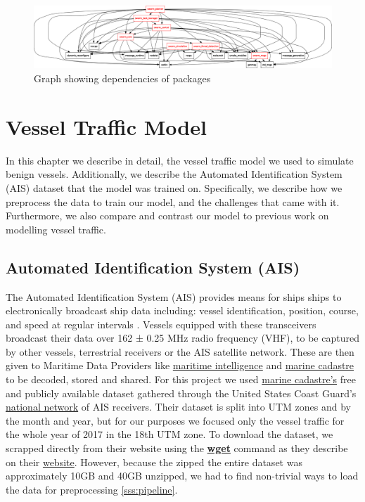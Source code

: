 \documentclass[bsc,frontabs,twoside,singlespacing,parskip,deptreport]{infthesis}     %
\begin{document}
\begin{figure}
    \centering
    \includegraphics[width=\linewidth]{report/images/rospackgraph.png}
    \caption{Graph showing dependencies of packages}
    \label{img:packages}
\end{figure}


\chapter{Vessel Traffic Model}
\label{chap:model}
In this chapter we describe in detail, the vessel traffic model we used to simulate benign vessels. Additionally, we describe the Automated Identification System (AIS) dataset that the model was trained on. Specifically, we describe how we preprocess the data to train our model, and the challenges that came with it. Furthermore, we also compare and contrast our model to previous work on modelling vessel traffic.

\section{Automated Identification System (AIS)}
\label{sec:ais}
The Automated Identification System (AIS) provides means for ships ships to electronically broadcast ship data including: vessel identification, position, course, and speed at regular intervals \citep{perez2009automatic}. Vessels equipped with these transceivers broadcast their data over 162 ± 0.25 MHz radio frequency (VHF), to be captured by other vessels, terrestrial receivers or the AIS satellite network. These are then given to Maritime Data Providers like \href{https://maritimeintelligence.informa.com/}{maritime intelligence} and \href{https://marinecadastre.gov/ais/}{marine cadastre} to be decoded, stored and shared. For this project we used \href{https://marinecadastre.gov/ais/}{marine cadastre's} free and publicly available dataset gathered through the United States Coast Guard's \href{https://www.navcen.uscg.gov/?pageName=NAISmain}{national network} of AIS receivers. Their dataset is split into UTM zones and by the month and year, but for our purposes we focused only the vessel traffic for the whole year of 2017 in the 18th UTM zone. To download the dataset, we scrapped directly from their website using the \href{https://www.gnu.org/software/wget/}{\textbf{wget}} command as they describe on their \href{https://coast.noaa.gov/htdata/CMSP/AISDataHandler/2017/index.html}{website}. However, because the zipped the entire dataset was approximately 10GB and 40GB unzipped, we had to find non-trivial ways to load the data for preprocessing \ref{sss:pipeline}.
\end{document}
